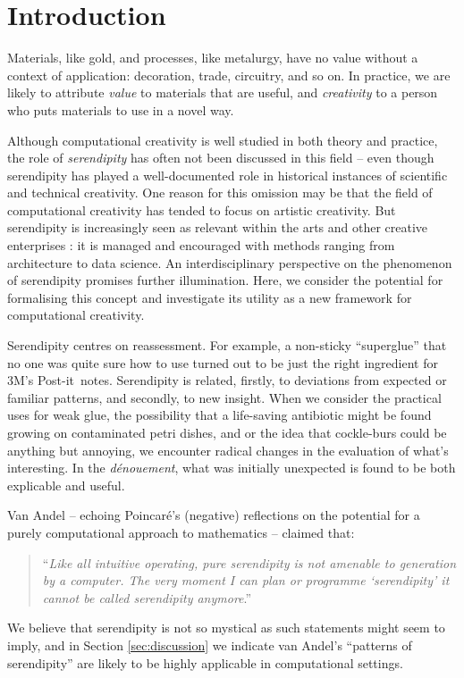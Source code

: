 \section{Introduction}

Materials, like gold, and processes, like metalurgy, have no value
without a context of application: decoration, trade, circuitry, and so
on.  In practice, we are likely to attribute \emph{value} to materials
that are useful, and \emph{creativity} to a person who puts materials
to use in a novel way.

Although computational creativity is well studied in both theory and
practice, the role of \emph{serendipity} has often not been discussed
in this field -- even though serendipity has played a well-documented
role in historical instances of scientific and technical creativity.
One reason for this omission may be that the field of computational
creativity has tended to focus on artistic creativity.  But
serendipity is increasingly seen as relevant within the arts
\cite{mckay-serendipity} and other creative enterprises
\cite{kakko2009homo,engineering-serendipity}: it is managed and
encouraged with methods ranging from architecture to data science.
%
An interdisciplinary perspective on the phenomenon of serendipity
promises further illumination.  Here, we consider the potential for
formalising this concept and investigate its utility as a new
framework for computational creativity.

Serendipity centres on reassessment.  For example, a non-sticky
``superglue'' that no one was quite sure how to use turned out to be
just the right ingredient for 3M's Post-it\texttrademark\ notes.
%
Serendipity is related, firstly, to deviations from expected or
familiar patterns, and secondly, to new insight.
%
When we consider the practical uses for weak glue, the possibility
that a life-saving antibiotic might be found growing on contaminated
petri dishes, and or the idea that cockle-burs could be anything but
annoying, we encounter radical changes in the evaluation of what's
interesting.  In the \emph{d\'enouement}, what was initially
unexpected is found to be both explicable and useful.

Van Andel \citeyear{van1994anatomy} -- echoing Poincar\'e's
\citeyear{poincare1910creation} (negative) reflections on the potential
for a purely computational approach to mathematics -- claimed that:
\begin{quote}
``\emph{Like all intuitive operating, pure serendipity is not amenable
    to generation by a computer.  The very moment I can plan or
    programme `serendipity' it cannot be called serendipity
    anymore}.'' \cite{van1994anatomy}
\end{quote}
We believe that serendipity is not so mystical as such statements
might seem to imply, and in Section \ref{sec:discussion} we indicate
van Andel's ``patterns of serendipity'' are likely to be highly
applicable in computational settings.

